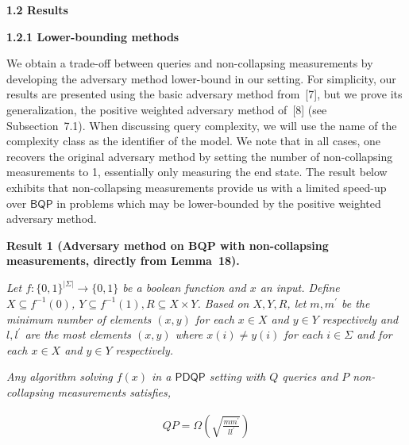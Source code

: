 \documentclass[10pt,a4paper]{article}
\begin{document}
\par\medskip\noindent\textbf{
1.2 Results}\par




\par\medskip\noindent\textbf{
1.2.1 Lower-bounding methods}\par




We obtain a trade-off between queries and non-collapsing measurements by developing the adversary method lower-bound in our setting. For simplicity, our results are presented using the basic adversary method from [7], but we prove its generalization, the positive weighted adversary method of [8] (see Subsection 7.1). When discussing query complexity, we will use the name of the complexity class as the identifier of the model. We note that in all cases, one recovers the original adversary method by setting the number of non-collapsing measurements to 1, essentially only measuring the end state. The result below exhibits that non-collapsing measurements provide us with a limited speed-up over $\mathsf{BQP}$ in problems which may be lower-bounded by the positive weighted adversary method.\par





\par\medskip\noindent\textbf{
\textbf{Result 1}\textbf{ }(\textbf{Adversary method on BQP with non-collapsing measurements}, directly from Lemma 18)\textbf{.}
}\par



\emph{Let $f:\{0,1\}^{|\Sigma|}\rightarrow\{0,1\}$ be a boolean function and $x$ an input.
Define $X\subseteq f^{-1}(0)$, $Y\subseteq f^{-1}(1),R\subseteq X\times Y$. Based on $X,Y,R$, let $m,m^{\prime}$ be the minimum number of elements $(x,y)$ for each $x\in X$ and $y\in Y$ respectively and $l,l^{\prime}$ are the most elements $(x,y)$ where $x(i)\neq y(i)$ for each $i\in\Sigma$ and for each $x\in X$ and $y\in Y$ respectively.}\par




\emph{Any algorithm solving $f(x)$ in a $\mathsf{PDQP}$ setting with $Q$ queries and $P$ non-collapsing measurements satisfies,}\par


\[\begin{gathered}
\displaystyle QP=\Omega\left(\sqrt{\frac{mm^{\prime}}{ll^{\prime}}}\right)
\end{gathered}\]
\end{document}
